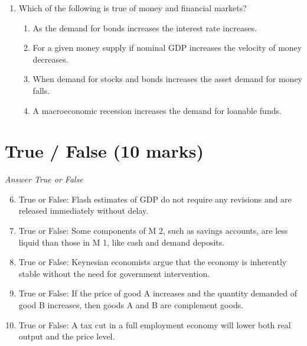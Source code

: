 \documentclass[12pt]{article}
\begin{document}
\begin{enumerate}[label=\arabic*.]
\begin{enumerate}[label=(\alph*)]
    \item The equilibrium price will fall and the equilibrium quantity will rise.
    \item The equilibrium price and the equilibrium quantity will both rise.
    \item The equilibrium price and the equilibrium quantity will both fall.
\end{enumerate}
\item Which of the following is true of money and financial markets?
\begin{enumerate}[label=(\alph*)]
    \item As the demand for bonds increases the interest rate increases.
    \item For a given money supply if nominal GDP increases the velocity of money decreases.
    \item When demand for stocks and bonds increases the asset demand for money falls.
    \item A macroeconomic recession increases the demand for loanable funds.
\end{enumerate}
\end{enumerate}

\section*{True / False (10 marks)}
\textit{Answer True or False}
\begin{enumerate}[label=\arabic*.]
\setcounter{enumi}{5}
\item True or False: Flash estimates of GDP do not require any revisions and are released immediately without delay.
\item True or False: Some components of M 2, such as savings accounts, are less liquid than those in M 1, like cash and demand deposits.
\item True or False: Keynesian economists argue that the economy is inherently stable without the need for government intervention.
\item True or False: If the price of good A increases and the quantity demanded of good B increases, then goods A and B are complement goods.
\item True or False: A tax cut in a full employment economy will lower both real output and the price level.
\end{enumerate}
\end{document}
